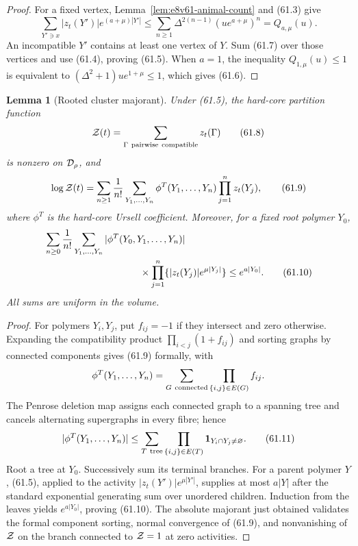 \documentclass[11pt,oneside]{book}
\newtheorem{lemma}[theorem]{Lemma}
\theoremstyle{definition}
\theoremstyle{remark}
\begin{document}
\begin{proof}
For a fixed vertex, Lemma~\ref{lem:e8v61-animal-count} and (61.3)
give
\[
 \sum_{Y'\ni x}|z_t(Y')|e^{(a+\mu)|Y'|}
 \le\sum_{n\ge1}\Delta^{2(n-1)}
       (ue^{a+\mu})^n=Q_{a,\mu}(u).                          \tag{61.7}
\]
An incompatible \(Y'\) contains at least one vertex of \(Y\).
Sum (61.7) over those vertices and use (61.4), proving (61.5).
When \(a=1\), the inequality
\(Q_{1,\mu}(u)\le1\) is equivalent to
\((\Delta^2+1)ue^{1+\mu}\le1\), which gives (61.6).
\end{proof}

\begin{lemma}[Rooted cluster majorant]
\label{lem:e8v61-rooted-cluster}
Under (61.5), the hard-core partition function
\[
 {\cal Z}(t)=
 \sum_{\Gamma\ {\rm pairwise\ compatible}}z_t(\Gamma)       \tag{61.8}
\]
is nonzero on \({\cal D}_\rho\), and
\[
 \log{\cal Z}(t)
 =\sum_{n\ge1}\frac1{n!}
   \sum_{Y_1,\ldots,Y_n}
   \phi^T(Y_1,\ldots,Y_n)\prod_{j=1}^nz_t(Y_j),              \tag{61.9}
\]
where \(\phi^T\) is the hard-core Ursell coefficient.  Moreover,
for a fixed root polymer \(Y_0\),
\[
\begin{split}
 &\sum_{n\ge0}\frac1{n!}
  \sum_{Y_1,\ldots,Y_n}
  |\phi^T(Y_0,Y_1,\ldots,Y_n)|\\
 &\hspace{35mm}\times
  \prod_{j=1}^n\{|z_t(Y_j)|e^{\mu|Y_j|}\}
 \le e^{a|Y_0|}.                                             \tag{61.10}
\end{split}
\]
All sums are uniform in the volume.
\end{lemma}

\begin{proof}
For polymers \(Y_i,Y_j\), put \(f_{ij}=-1\) if they intersect and
zero otherwise.  Expanding the compatibility product
\(\prod_{i<j}(1+f_{ij})\) and sorting graphs by connected
components gives (61.9) formally, with
\[
 \phi^T(Y_1,\ldots,Y_n)
 =\sum_{G\ {\rm connected}}\prod_{\{i,j\}\in E(G)}f_{ij}.
\]
The Penrose deletion map assigns each connected graph to a spanning
tree and cancels alternating supergraphs in every fibre; hence
\[
 |\phi^T(Y_1,\ldots,Y_n)|
 \le\sum_{T\ {\rm tree}}
      \prod_{\{i,j\}\in E(T)}{\bf1}_{Y_i\cap Y_j\ne\varnothing}.
                                                                    \tag{61.11}
\]
Root a tree at \(Y_0\).  Successively sum its terminal branches.
For a parent polymer \(Y\), (61.5), applied to the activity
\(|z_t(Y')|e^{\mu|Y'|}\), supplies at most \(a|Y|\) after the
standard exponential generating sum over unordered children.
Induction from the leaves yields \(e^{a|Y_0|}\), proving (61.10).
The absolute majorant just obtained validates the formal component
sorting, normal convergence of (61.9), and nonvanishing of
\({\cal Z}\) on the branch connected to \({\cal Z}=1\) at zero
activities.
\end{proof}
\end{document}
